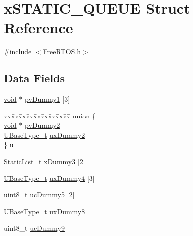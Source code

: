 \hypertarget{structxSTATIC__QUEUE}{\section{x\-S\-T\-A\-T\-I\-C\-\_\-\-Q\-U\-E\-U\-E Struct Reference}
\label{structxSTATIC__QUEUE}
}


{\ttfamily \#include $<$Free\-R\-T\-O\-S.\-h$>$}

\subsection*{Data Fields}
\begin{DoxyCompactItemize}
\item 
\hyperlink{Paradigm_2Tern__EE_2small_2portmacro_8h_a14d32f8130d3c0b212cfc751730b5b49}{void} $\ast$ \hyperlink{structxSTATIC__QUEUE_aacf22a66a8d723648995692ec77ee416}{pv\-Dummy1} \mbox{[}3\mbox{]}
\item 
\begin{tabbing}
xx\=xx\=xx\=xx\=xx\=xx\=xx\=xx\=xx\=\kill
union \{\\
\>\hyperlink{Paradigm_2Tern__EE_2small_2portmacro_8h_a14d32f8130d3c0b212cfc751730b5b49}{void} $\ast$ \hyperlink{structxSTATIC__QUEUE_adb72a02b22a558f6fad381d65af5ac68}{pvDummy2}\\
\>\hyperlink{Flsh186_2prtmacro_8h_a8e88a5e44a5243b3d1c29af17fd6b5bd}{UBaseType\_t} \hyperlink{structxSTATIC__QUEUE_ab4e6a2a0bb59ba54d05927e99afd553f}{uxDummy2}\\
\} \hyperlink{structxSTATIC__QUEUE_a8a896145a0d9376a7e2713afdd782c41}{u}\\

\end{tabbing}\item 
\hyperlink{FreeRTOS_8h_a9735ad9101a2bd25f83a62089a4acee6}{Static\-List\-\_\-t} \hyperlink{structxSTATIC__QUEUE_add0de93e08b632124122850bcd543597}{x\-Dummy3} \mbox{[}2\mbox{]}
\item 
\hyperlink{Flsh186_2prtmacro_8h_a8e88a5e44a5243b3d1c29af17fd6b5bd}{U\-Base\-Type\-\_\-t} \hyperlink{structxSTATIC__QUEUE_a502854697731754ce445f6503d14b127}{ux\-Dummy4} \mbox{[}3\mbox{]}
\item 
uint8\-\_\-t \hyperlink{structxSTATIC__QUEUE_a541c5044376603540cc3c9cabcbdc5e6}{uc\-Dummy5} \mbox{[}2\mbox{]}
\item 
\hyperlink{Flsh186_2prtmacro_8h_a8e88a5e44a5243b3d1c29af17fd6b5bd}{U\-Base\-Type\-\_\-t} \hyperlink{structxSTATIC__QUEUE_a9c763680025a3205671239a3a535d22d}{ux\-Dummy8}
\item 
uint8\-\_\-t \hyperlink{structxSTATIC__QUEUE_a9442f864adb35e210702e0657a5a7a7b}{uc\-Dummy9}
\end{DoxyCompactItemize}


